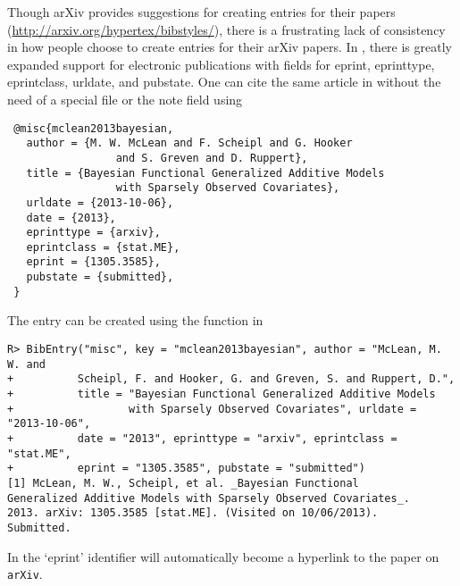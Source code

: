 \documentclass[article]{jss}\usepackage[]{graphicx}\usepackage[]{color}
\makeatletter
\newenvironment{kframe}{%
 \def\at@end@of@kframe{}%
 \ifinner\ifhmode%
  \def\at@end@of@kframe{\end{minipage}}%
  \begin{minipage}{\columnwidth}%
 \fi\fi%
 \def\FrameCommand##1{\hskip\@totalleftmargin \hskip-\fboxsep
 \colorbox{shadecolor}{##1}\hskip-\fboxsep
     \hskip-\linewidth \hskip-\@totalleftmargin \hskip\columnwidth}%
 \MakeFramed {\advance\hsize-\width
   \@totalleftmargin\z@ \linewidth\hsize
   \@setminipage}}%
 {\par\unskip\endMakeFramed%
 \at@end@of@kframe}
\newenvironment{knitrout}{}{} %
\newcommand{\ourpkg}{\pkg{RefManageR}}
\makeatother
\begin{document}
Though arXiv provides suggestions for creating \Bibtex{} entries for their papers (\url{http://arxiv.org/hypertex/bibstyles/}), there is a frustrating lack of consistency in how people choose to create \Bibtex{} entries for their arXiv papers.  In \Biblatex{}, there is greatly expanded support for electronic publications with fields for eprint, eprinttype, eprintclass, urldate, and pubstate.  One can cite the same article in \Biblatex{} without the need of a special  file or the note field using
 \begin{verbatim}
 @misc{mclean2013bayesian,
   author = {M. W. McLean and F. Scheipl and G. Hooker
                 and S. Greven and D. Ruppert},
   title = {Bayesian Functional Generalized Additive Models 
                 with Sparsely Observed Covariates},
   urldate = {2013-10-06},
   date = {2013},
   eprinttype = {arxiv},
   eprintclass = {stat.ME},
   eprint = {1305.3585},
   pubstate = {submitted},
 }
 \end{verbatim}
 The entry can be created using the  function in \ourpkg{}
\begin{knitrout}
\color{fgcolor}\begin{kframe}
\begin{verbatim}
R> BibEntry("misc", key = "mclean2013bayesian", author = "McLean, M. W. and 
+          Scheipl, F. and Hooker, G. and Greven, S. and Ruppert, D.",
+          title = "Bayesian Functional Generalized Additive Models 
+                  with Sparsely Observed Covariates", urldate = "2013-10-06", 
+          date = "2013", eprinttype = "arxiv", eprintclass = "stat.ME", 
+          eprint = "1305.3585", pubstate = "submitted")
[1] McLean, M. W., Scheipl, et al. _Bayesian Functional
Generalized Additive Models with Sparsely Observed Covariates_.
2013. arXiv: 1305.3585 [stat.ME]. (Visited on 10/06/2013).
Submitted.
\end{verbatim}
\end{kframe}
\end{knitrout}

In \Biblatex{} the `eprint' identifier will automatically become a hyperlink to the paper on \texttt{arXiv}.  
\end{document}
